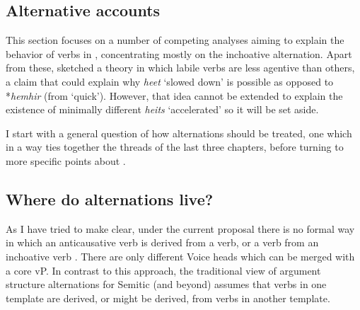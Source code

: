 \begin{exe}
\begin{xlist}
\begin{xlist}
\begin{exe}
\begin{exe}
\begin{xlist}
\begin{exe}
\begin{xlist}
\begin{exe}
\begin{xlist}
\begin{xlist}
\begin{exe}
\begin{xlist}
\begin{exe}
\begin{xlist}
\begin{exe}
\begin{exe}
\begin{exe}
\begin{xlist}
\begin{exe}
\begin{exe}
\begin{xlist}
\begin{xlist}
\begin{exe}
\begin{xlist}
\begin{exe}
\begin{exe}
\begin{exe}
\begin{xlist}
\begin{exe}
\begin{exe}
\begin{xlist}
\begin{exe}
\begin{xlist}
\begin{exe}
\begin{xlist}
\begin{exe}
\begin{xlist}
\begin{exe}
\begin{exe}
\begin{xlist}
\begin{exe}
\begin{exe}
\begin{xlist}
\begin{xlist}
\begin{exe}
\begin{xlist}
\begin{xlist}
\begin{exe}
\begin{xlist}
\begin{exe}
\begin{xlist}
\begin{exe}
\begin{xlist}
\begin{exe}
\begin{xlist}
\begin{exe}
\begin{exe}
\begin{exe}
\begin{exe}
\begin{xlist}
\begin{exe}
\begin{exe}
\begin{xlist}
\begin{xlist}
\begin{exe}
\section{Alternative accounts} \label{vd:others}
This section focuses on a number of competing analyses aiming to explain the behavior of verbs in {\thif}, concentrating mostly on the inchoative alternation. Apart from these, \cite{lev16} sketched a theory in which labile verbs are less agentive than others, a claim that could explain why \emph{heet} `slowed down' is possible as opposed to *\emph{hemhir} (from `quick'). However, that idea cannot be extended to explain the existence of minimally different \emph{hei{ts}} `accelerated' so it will be set aside.

I start with a general question of how alternations should be treated, one which in a way ties together the threads of the last three chapters, before turning to more specific points about {\thif}.
	
	\subsection{Where do alternations live?} \label{vd:others:arad}
As I have tried to make clear, under the current proposal there is no formal way in which an anticausative verb is derived from a  verb, or a  verb from an inchoative verb \citep{schaefer08}. There are only different Voice heads which can be merged with a core vP. In contrast to this approach, the traditional view of argument structure alternations for Semitic (and beyond) assumes that verbs in one template are derived, or might be derived, from verbs in another template.


\end{exe}
\end{xlist}
\end{xlist}
\end{exe}
\end{exe}
\end{xlist}
\end{exe}
\end{exe}
\end{exe}
\end{exe}
\end{xlist}
\end{exe}
\end{xlist}
\end{exe}
\end{xlist}
\end{exe}
\end{xlist}
\end{exe}
\end{xlist}
\end{xlist}
\end{exe}
\end{xlist}
\end{xlist}
\end{exe}
\end{exe}
\end{xlist}
\end{exe}
\end{exe}
\end{xlist}
\end{exe}
\end{xlist}
\end{exe}
\end{xlist}
\end{exe}
\end{xlist}
\end{exe}
\end{exe}
\end{xlist}
\end{exe}
\end{exe}
\end{exe}
\end{xlist}
\end{exe}
\end{xlist}
\end{xlist}
\end{exe}
\end{exe}
\end{xlist}
\end{exe}
\end{exe}
\end{exe}
\end{xlist}
\end{exe}
\end{xlist}
\end{exe}
\end{xlist}
\end{xlist}
\end{exe}
\end{xlist}
\end{exe}
\end{xlist}
\end{exe}
\end{exe}
\end{xlist}
\end{xlist}
\end{exe}
